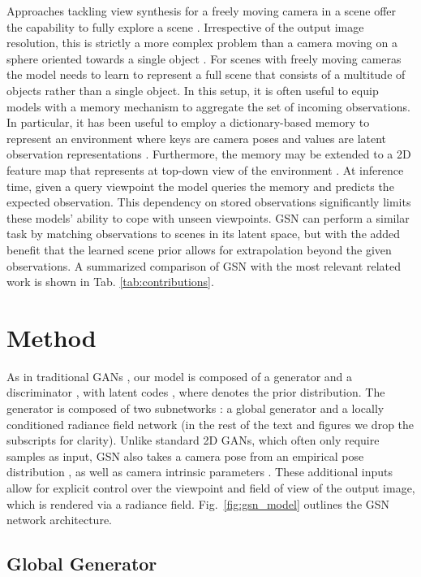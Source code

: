 \documentclass[10pt,twocolumn,letterpaper]{article}
\begin{document}
Approaches tackling view synthesis for a freely moving camera in a scene offer the capability to fully explore a scene \cite{gqn,gtmsm,iss}. Irrespective of the output image resolution, this is strictly a more complex problem than a camera moving on a sphere oriented towards a single object \cite{srn,appearanceflow,multiview2novelview,pixelnerf,graf,giraffe,pigan}. For scenes with freely moving cameras the model needs to learn to represent a full scene that consists of a multitude of objects rather than a single object. In this setup, it is often useful to equip models with a memory mechanism to aggregate the set of incoming observations. In particular, it has been useful to employ a dictionary-based memory to represent an environment where keys are camera poses and values are latent observation representations \cite{gtmsm}. Furthermore, the memory may be extended to a 2D feature map that represents at top-down view of the environment \cite{gqn,iss}. At inference time, given a query viewpoint the model queries the memory and predicts the expected observation. This dependency on stored observations significantly limits these models' ability to cope with unseen viewpoints. GSN can perform a similar task by matching observations to scenes in its latent space, but with the added benefit that the learned scene prior allows for extrapolation beyond the given observations. A summarized comparison of GSN with the most relevant related work is shown in Tab. \ref{tab:contributions}.


\section{Method}

 As in traditional GANs \cite{gan}, our model is composed of a generator  and a discriminator , with latent codes , where  denotes the prior distribution. The generator  is composed of two subnetworks : a global generator  and a locally conditioned radiance field network  (in the rest of the text and figures we drop the subscripts for clarity). Unlike standard 2D GANs, which often only require samples  as input, GSN also takes a camera pose  from an empirical pose distribution , as well as camera intrinsic parameters . These additional inputs allow for explicit control over the viewpoint and field of view of the output image, which is rendered via a radiance field. Fig.~\ref{fig:gsn_model} outlines the GSN network architecture.

\subsection{Global Generator}
\end{document}
